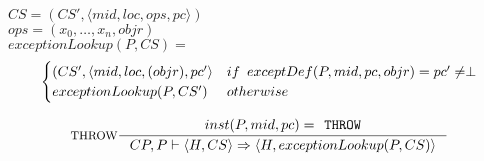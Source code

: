 \noindent$CS = (CS', \langle mid, loc, ops, pc \rangle)$ \\ 
$ops = (x_0, \ldots, x_n, objr)$\vspace{5px} \\
$exceptionLookup(P, CS) = $ \vspace{-10px} \\
\[
\begin{cases}
  (CS', \langle mid, loc, (objr), pc' \rangle  & if \hspace{5px} exceptDef(P, mid, pc, objr) = pc' \neq \perp\\
  exceptionLookup(P, CS') & otherwise
\end{cases}
\]

$$\inference[THROW]{
inst(P,mid,pc) = \texttt{THROW} }
{CP, P \vdash \langle H, CS \rangle \Rightarrow \langle H, exceptionLookup(P,CS)\rangle}$$
